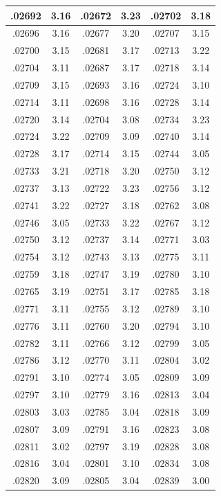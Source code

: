 \documentclass[10pt,twoside]{report}
\begin{document}
\begin{appendices}
\begin{longtable}{|c|c||c|c||c|c|}
.02692 & 3.16 & .02672 & 3.23 & .02702 & 3.18\\\hline
.02696 & 3.16 & .02677 & 3.20 & .02707 & 3.15\\\hline
.02700 & 3.15 & .02681 & 3.17 & .02713 & 3.22\\\hline
.02704 & 3.11 & .02687 & 3.17 & .02718 & 3.14\\\hline
.02709 & 3.15 & .02693 & 3.16 & .02724 & 3.10\\\hline
.02714 & 3.11 & .02698 & 3.16 & .02728 & 3.14\\\hline
.02720 & 3.14 & .02704 & 3.08 & .02734 & 3.23\\\hline
.02724 & 3.22 & .02709 & 3.09 & .02740 & 3.14\\\hline
.02728 & 3.17 & .02714 & 3.15 & .02744 & 3.05\\\hline
.02733 & 3.21 & .02718 & 3.20 & .02750 & 3.12\\\hline
.02737 & 3.13 & .02722 & 3.23 & .02756 & 3.12\\\hline
.02741 & 3.22 & .02727 & 3.18 & .02762 & 3.08\\\hline
.02746 & 3.05 & .02733 & 3.22 & .02767 & 3.12\\\hline
.02750 & 3.12 & .02737 & 3.14 & .02771 & 3.03\\\hline
.02754 & 3.12 & .02743 & 3.13 & .02775 & 3.11\\\hline
.02759 & 3.18 & .02747 & 3.19 & .02780 & 3.10\\\hline
.02765 & 3.19 & .02751 & 3.17 & .02785 & 3.18\\\hline
.02771 & 3.11 & .02755 & 3.12 & .02789 & 3.10\\\hline
.02776 & 3.11 & .02760 & 3.20 & .02794 & 3.10\\\hline
.02782 & 3.11 & .02766 & 3.12 & .02799 & 3.05\\\hline
.02786 & 3.12 & .02770 & 3.11 & .02804 & 3.02\\\hline
.02791 & 3.10 & .02774 & 3.05 & .02809 & 3.09\\\hline
.02797 & 3.10 & .02779 & 3.16 & .02813 & 3.04\\\hline
.02803 & 3.03 & .02785 & 3.04 & .02818 & 3.09\\\hline
.02807 & 3.09 & .02791 & 3.16 & .02823 & 3.08\\\hline
.02811 & 3.02 & .02797 & 3.19 & .02828 & 3.08\\\hline
.02816 & 3.04 & .02801 & 3.10 & .02834 & 3.08\\\hline
.02820 & 3.09 & .02805 & 3.04 & .02839 & 3.00\\\hline

\end{longtable}
\end{appendices}
\end{document}
